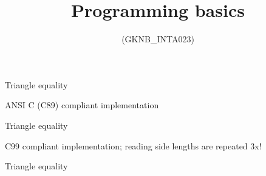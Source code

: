 \documentclass[usenames,dvipsnames,aspectratio=169]{beamer}
\title[Lecture 4.]{Programming basics}
\subtitle{(GKNB\_INTA023)}
\begin{document}
\begin{frame}[plain]
  \titlepage
  \logoalul
\end{frame}

\begin{frame}{Triangle equality}
  \begin{exampleblock}{ ANSI C (C89) compliant implementation}
  \tiny
  \vspace{-.3cm}
  
  \vspace{-.3cm}
  \end{exampleblock}
\end{frame}

\begin{frame}{Triangle equality}
  \footnotesize
  \begin{exampleblock}{ C99 compliant implementation; reading side lengths are repeated 3x!}
  \tiny
  \vspace{-.3cm}
  
  \vspace{-.3cm}
  \end{exampleblock}
\end{frame}

\begin{frame}{Triangle equality}
  \begin{exampleblock}{}
    \tiny
    \vspace{-.3cm}
    
    \vspace{-.3cm}
  \end{exampleblock}
\end{frame}
\end{document}
